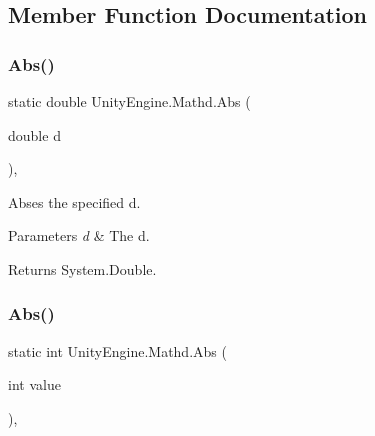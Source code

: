\subsection{Member Function Documentation}
\mbox{\label{struct_unity_engine_1_1_mathd_a64a85be6bf373ab9e9213992577465c7}} 
\subsubsection{\texorpdfstring{Abs()}{Abs()}\hspace{0.1cm}{\footnotesize\ttfamily [1/2]}}
{\footnotesize\ttfamily static double Unity\+Engine.\+Mathd.\+Abs (\begin{DoxyParamCaption}\item[{double}]{d }\end{DoxyParamCaption})\hspace{0.3cm}{\ttfamily [inline]}, {\ttfamily [static]}}



Abses the specified d. 


\begin{DoxyParams}{Parameters}
{\em d} & The d.\\
\hline
\end{DoxyParams}
\begin{DoxyReturn}{Returns}
System.\+Double.
\end{DoxyReturn}
\mbox{\label{struct_unity_engine_1_1_mathd_a0026ca0e9eb2b52802dbd16c682c2e1c}} 
\subsubsection{\texorpdfstring{Abs()}{Abs()}\hspace{0.1cm}{\footnotesize\ttfamily [2/2]}}
{\footnotesize\ttfamily static int Unity\+Engine.\+Mathd.\+Abs (\begin{DoxyParamCaption}\item[{int}]{value }\end{DoxyParamCaption})\hspace{0.3cm}{\ttfamily [inline]}, {\ttfamily [static]}}



